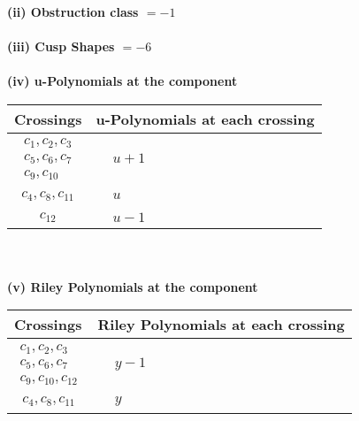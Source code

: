 \documentclass[1p]{elsarticle_modified}
\theoremstyle{definition}
\begin{document}
\flushleft \textbf{(ii) Obstruction class $= -1$}\\~\\
\flushleft \textbf{(iii) Cusp Shapes $= -6$}\\~\\
\newpage\renewcommand{\arraystretch}{1}
\flushleft \textbf{(iv) u-Polynomials at the component}\newline \\
\begin{tabular}{m{50pt}|m{274pt}}
Crossings & \hspace{64pt}u-Polynomials at each crossing \\
\hline $$\begin{aligned}c_{1},c_{2},c_{3}\\c_{5},c_{6},c_{7}\\c_{9},c_{10}\end{aligned}$$&$\begin{aligned}
&u+1
\end{aligned}$\\
\hline $$\begin{aligned}c_{4},c_{8},c_{11}\end{aligned}$$&$\begin{aligned}
&u
\end{aligned}$\\
\hline $$\begin{aligned}c_{12}\end{aligned}$$&$\begin{aligned}
&u-1
\end{aligned}$\\
\hline
\end{tabular}\\~\\
\newpage\renewcommand{\arraystretch}{1}
\flushleft \textbf{(v) Riley Polynomials at the component}\newline \\
\begin{tabular}{m{50pt}|m{274pt}}
Crossings & \hspace{64pt}Riley Polynomials at each crossing \\
\hline $$\begin{aligned}c_{1},c_{2},c_{3}\\c_{5},c_{6},c_{7}\\c_{9},c_{10},c_{12}\end{aligned}$$&$\begin{aligned}
&y-1
\end{aligned}$\\
\hline $$\begin{aligned}c_{4},c_{8},c_{11}\end{aligned}$$&$\begin{aligned}
&y
\end{aligned}$\\
\hline
\end{tabular}\\~\\
\end{document}
